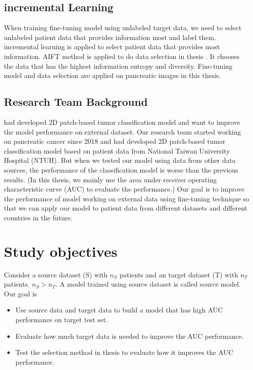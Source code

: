 \subsection{incremental Learning}
When training fine-tuning model using unlabeled target data, we need to select unlabeled patient data that provides information most and label them. incremental learning is applied to select patient data that provides most information. AIFT method is applied to do data selection in thesis \cite{zhou2017fine}. It chooses the data that has the highest information entropy and diversity. Fine-tuning model and data selection are applied on pancreatic images in this thesis.



\subsection{Research Team Background}
\cite{liu2020deep} had developed 2D patch-based tumor classification model and want to improve the model performance on external dataset. Our research team started working on pancreatic cancer since 2018 and had developed 2D patch-based tumor classification model based on patient data from National Taiwan University Hospital (NTUH). But when we tested our model using data from other data sources, the performance of the classification model is worse than the previous results. (In this thesis, we mainly use the area under receiver operating characteristic curve (AUC) to evaluate the performance.) Our goal is to improve the performance of model working on external data using fine-tuning technique so that we can apply our model to patient data from different datasets and different countries in the future.

\section{Study objectives}

Consider a source dataset (S) with $ n_S $  patients and an target dataset (T) with $  n_T  $ patients. $  n_S > n_T $. A model trained using source dataset is called source model. Our goal is 
\begin{itemize}
    \item Use source data and target data to build a model that has high AUC performance on target test set.
    \item Evaluate how much target data is needed to improve the AUC performance.
    \item Test the selection method in thesis \cite{zhou2017fine} to evaluate how it improves the AUC performance. 
\end{itemize}
